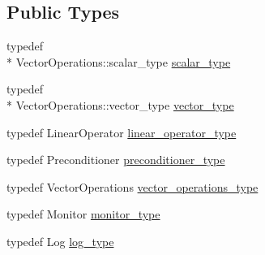 \subsection*{Public Types}
\begin{DoxyCompactItemize}
\item 
typedef \\*
Vector\-Operations\-::scalar\-\_\-type \hyperlink{classnumerical__algos_1_1lin__solvers_1_1iter__solver__base_a64c84955e85f9cc556fa8628edc8f7c8}{scalar\-\_\-type}
\item 
typedef \\*
Vector\-Operations\-::vector\-\_\-type \hyperlink{classnumerical__algos_1_1lin__solvers_1_1iter__solver__base_a474414aa5d9e2b387f48a6bf182c47eb}{vector\-\_\-type}
\item 
typedef Linear\-Operator \hyperlink{classnumerical__algos_1_1lin__solvers_1_1iter__solver__base_a547488978437ea7057c7fb113261407d}{linear\-\_\-operator\-\_\-type}
\item 
typedef Preconditioner \hyperlink{classnumerical__algos_1_1lin__solvers_1_1iter__solver__base_a0746ff1186cb6e8e5648b16065c9cdd2}{preconditioner\-\_\-type}
\item 
typedef Vector\-Operations \hyperlink{classnumerical__algos_1_1lin__solvers_1_1iter__solver__base_a1c0c7f5af3b439d5a53ce2433d6acb79}{vector\-\_\-operations\-\_\-type}
\item 
typedef Monitor \hyperlink{classnumerical__algos_1_1lin__solvers_1_1iter__solver__base_a942121df2f8589f8c93aee94e0d23930}{monitor\-\_\-type}
\item 
typedef Log \hyperlink{classnumerical__algos_1_1lin__solvers_1_1iter__solver__base_ae5dde4a29dad1ba2bf67932b70d22b4c}{log\-\_\-type}
\end{DoxyCompactItemize}
